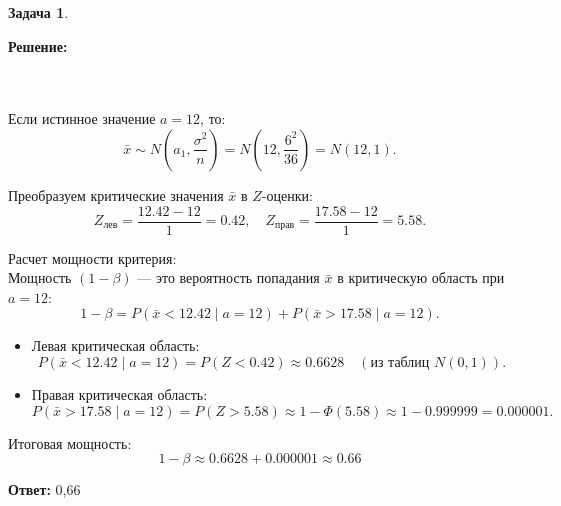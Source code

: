 \documentclass[a4paper,11pt]{article}
\newenvironment{shdd}{\begin{mdframed}[backgroundcolor=shadecolor]}{\end{mdframed}}
\theoremstyle{definition}
\newtheorem{problem}{Задача}\setlength{\parindent}{0pt}
\newenvironment{solution}
{\begin{shdd}
     \textbf{Решение:}\par\setlength{\parindent}{0pt}}
     {
\end{shdd}}
\newenvironment{answer}
{\par\noindent\textbf{Ответ:}}
{\par}
\begin{document}
\begin{problem}
\begin{solution}
            \\
            \\

            Если истинное значение \(a = 12\), то:
            \[
                \bar{x} \sim N\left(a_1, \frac{\sigma^2}{n}\right) = N\left(12, \frac{6^2}{36}\right) = N(12, 1).
            \]

            Преобразуем критические значения \(\bar{x}\) в \(Z\)-оценки:
            \[
                Z_{\text{лев}} = \frac{12.42 - 12}{1} = 0.42, \quad Z_{\text{прав}} = \frac{17.58 - 12}{1} = 5.58.
            \]

            Расчет мощности критерия:
            \\
            Мощность \((1-\beta)\) — это вероятность попадания \(\bar{x}\) в критическую область при \(a = 12\):
            \[
                1 - \beta = P(\bar{x} < 12.42 \mid a=12) + P(\bar{x} > 17.58 \mid a=12).
            \]

            \begin{itemize}
                \item Левая критическая область:
                \[
                    P(\bar{x} < 12.42 \mid a=12) = P\left(Z < 0.42\right) \approx 0.6628 \quad (\text{из таблиц } N(0,1)).
                \]

                \item Правая критическая область:
                \[
                    P(\bar{x} > 17.58 \mid a=12) = P\left(Z > 5.58\right) \approx 1 - \Phi(5.58) \approx 1 - 0.999999 = 0.000001.
                \]
            \end{itemize}

            Итоговая мощность:
            \[
                1 - \beta \approx 0.6628 + 0.000001 \approx 0.66
            \]
        \end{solution}

        \begin{answer}
            0,66
        \end{answer}

    \end{problem}
\end{document}
